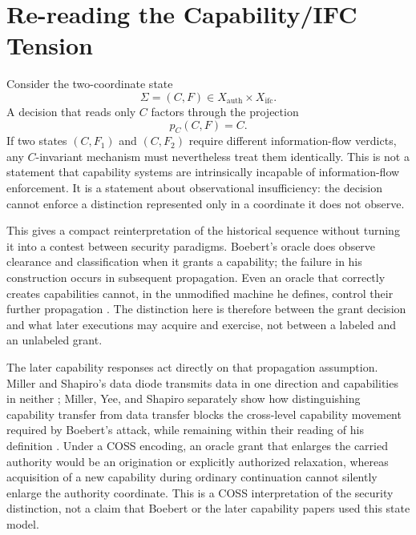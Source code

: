 \documentclass[10pt,twocolumn]{article}
\newcommand{\Model}{\textnormal{\textsc{COSS}}\xspace}
\newcommand{\state}{\Sigma}
\begin{document}
\section{Re-reading the Capability/IFC Tension}

Consider the two-coordinate state
\begin{equation}
  \state=(C,F)
  \in X_{\mathrm{auth}}\times X_{\mathrm{ifc}}.
\end{equation}
A decision that reads only $C$ factors through the projection
\begin{equation}
  p_C(C,F)=C.
\end{equation}
If two states $(C,F_1)$ and $(C,F_2)$ require different information-flow
verdicts, any $C$-invariant mechanism must nevertheless treat them identically.
This is not a statement that capability systems are intrinsically incapable of
information-flow enforcement.  It is a statement about observational
insufficiency: the decision cannot enforce a distinction represented only in a
coordinate it does not observe.

This gives a compact reinterpretation of the historical sequence without
turning it into a contest between security paradigms.  Boebert's oracle does
observe clearance and classification when it grants a capability; the failure
in his construction occurs in subsequent propagation.  Even an oracle that
correctly creates capabilities cannot, in the unmodified machine he defines,
control their further propagation \cite{boebert1984}.  The distinction here is
therefore between the grant decision and what later executions may acquire and
exercise, not between a labeled and an unlabeled grant.

The later capability responses act directly on that propagation assumption.
Miller and Shapiro's data diode transmits data in one direction and capabilities
in neither \cite{miller_shapiro2003}; Miller, Yee, and Shapiro separately show
how distinguishing capability transfer from data transfer blocks the cross-level
capability movement required by Boebert's attack, while remaining within their
reading of his definition \cite{miller_yee_shapiro2003}.  Under a \Model
encoding, an oracle grant that enlarges the carried authority would be an
origination or explicitly authorized relaxation, whereas acquisition of a new
capability during ordinary continuation cannot silently enlarge the authority
coordinate.  This is a \Model interpretation of the security distinction, not
a claim that Boebert or the later capability papers used this state model.
\end{document}
